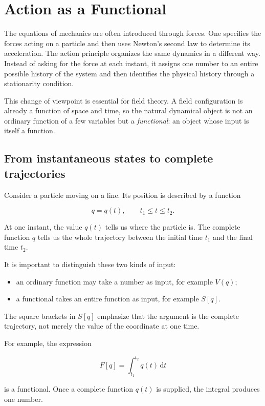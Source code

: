 \section{Action as a Functional}
\label{sec:action_as_a_functional}

The equations of mechanics are often introduced through forces. One specifies the forces acting on a particle and then uses Newton's second law to determine its acceleration. The action principle organizes the same dynamics in a different way. Instead of asking for the force at each instant, it assigns one number to an entire possible history of the system and then identifies the physical history through a stationarity condition.

This change of viewpoint is essential for field theory. A field configuration is already a function of space and time, so the natural dynamical object is not an ordinary function of a few variables but a \emph{functional}: an object whose input is itself a function.

\subsection{From instantaneous states to complete trajectories}

Consider a particle moving on a line. Its position is described by a function

\[
q=q(t),
\qquad t_{1}\leq t\leq t_{2}.
\]

At one instant, the value \(q(t)\) tells us where the particle is. The complete function \(q\) tells us the whole trajectory between the initial time \(t_{1}\) and the final time \(t_{2}\).

It is important to distinguish these two kinds of input:

\begin{itemize}
    \item an ordinary function may take a number as input, for example \(V(q)\);
    \item a functional takes an entire function as input, for example \(S[q]\).
\end{itemize}

The square brackets in \(S[q]\) emphasize that the argument is the complete trajectory, not merely the value of the coordinate at one time.

For example, the expression

\[
F[q]=\int_{t_{1}}^{t_{2}} q(t)\,\mathrm{d}t
\]

is a functional. Once a complete function \(q(t)\) is supplied, the integral produces one number.

